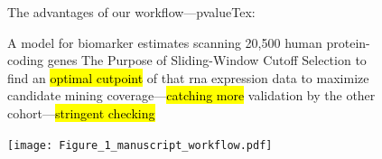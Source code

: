 \documentclass[
paper=landscape,
paper=160mm:90mm, %
fontsize=11pt, %
pagesize, %
parskip=half-, %
]{scrartcl} %
\theoremstyle{mythmstyle} %
\begin{document}
\thispagestyle{headings}
\begin{figure}

  \begin{minipage}[c]{0.45\linewidth}

The advantages of our workflow---pvalueTex:
\begin{outline}
\1 A model for biomarker estimates %
    \2 scanning 20,500 human protein-coding genes
\1 The Purpose of Sliding-Window Cutoff Selection
    \2 to find an \hl{optimal cutpoint} of that \acrshort{rna} expression data 
    \2 to maximize candidate mining coverage---\hl{catching more}
    \2 validation by the other cohort---\hl{stringent checking}
\end{outline}
\end{minipage}
\hfill
\begin{minipage}[c]{0.5\linewidth}
\texttt{[image: Figure\_1\_manuscript\_workflow.pdf]} %


\end{minipage}
\end{figure}
\end{document}
